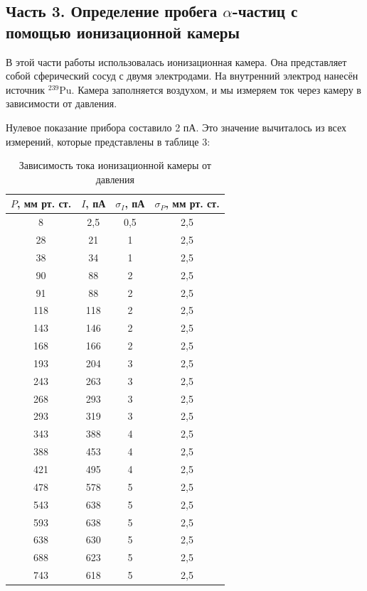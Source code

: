 \documentclass[12pt, a4paper]{article}
\begin{document}
\subsection*{Часть 3. Определение пробега $\alpha$-частиц с помощью ионизационной камеры}

В этой части работы использовалась ионизационная камера. Она представляет собой сферический сосуд с двумя электродами. На внутренний электрод нанесён источник $^{239}$Pu. Камера заполняется воздухом, и мы измеряем ток через камеру в зависимости от давления.

Нулевое показание прибора составило 2 пА. Это значение вычиталось из всех измерений, которые представлены в таблице 3:

\begin{table}[H]
\centering
\label{tab:ion_data}
\begin{tabular}{|c|c|c|c|}
\hline
$P$, мм рт. ст. & $I$, пА & $\sigma_I$, пА & $\sigma_P$, мм рт. ст. \\
\hline
8   & 2,5  & 0,5 & 2,5 \\
28  & 21   & 1   & 2,5 \\
38  & 34   & 1   & 2,5 \\
90  & 88   & 2   & 2,5 \\
91  & 88   & 2   & 2,5 \\
118 & 118  & 2   & 2,5 \\
143 & 146  & 2   & 2,5 \\
168 & 166  & 2   & 2,5 \\
193 & 204  & 3   & 2,5 \\
243 & 263  & 3   & 2,5 \\
268 & 293  & 3   & 2,5 \\
293 & 319  & 3   & 2,5 \\
343 & 388  & 4   & 2,5 \\
388 & 453  & 4   & 2,5 \\
421 & 495  & 4   & 2,5 \\
478 & 578  & 5   & 2,5 \\
543 & 638  & 5   & 2,5 \\
593 & 638  & 5   & 2,5 \\
638 & 630  & 5   & 2,5 \\
688 & 623  & 5   & 2,5 \\
743 & 618  & 5   & 2,5 \\
\hline
\end{tabular}
\caption{Зависимость тока ионизационной камеры от давления}
\end{table}
\end{document}
